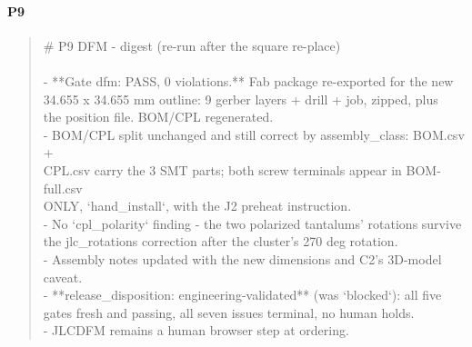 \documentclass[11pt,a4paper]{article}
\begin{document}
\paragraph*{P9}
\begin{quote}\small\ttfamily\raggedright
\# P9 DFM - digest (re-run after the square re-place)\\
~\\
- {*}{*}Gate dfm: PASS, 0 violations.{*}{*} Fab package re-exported for the new\\
  34.655 x 34.655 mm outline: 9 gerber layers + drill + job, zipped, plus\\
  the position file. BOM/CPL regenerated.\\
- BOM/CPL split unchanged and still correct by assembly\_class: BOM.csv +\\
  CPL.csv carry the 3 SMT parts; both screw terminals appear in BOM-full.csv\\
  ONLY, `hand\_install`, with the J2 preheat instruction.\\
- No `cpl\_polarity` finding - the two polarized tantalums' rotations survive\\
  the jlc\_rotations correction after the cluster's 270 deg rotation.\\
- Assembly notes updated with the new dimensions and C2's 3D-model caveat.\\
- {*}{*}release\_disposition: engineering-validated{*}{*} (was `blocked`): all five\\
  gates fresh and passing, all seven issues terminal, no human holds.\\
- JLCDFM remains a human browser step at ordering.
\end{quote}
\end{document}
